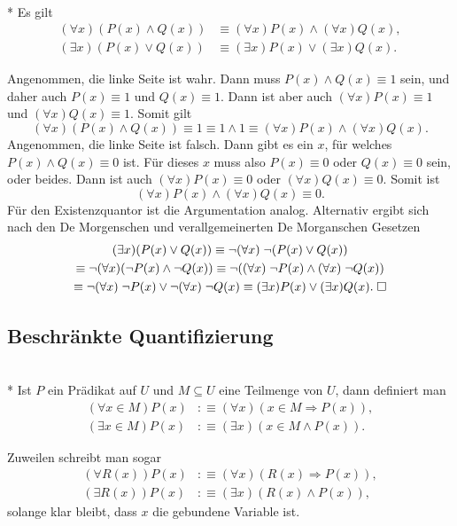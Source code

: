 \begin{Satz}[Verträglichkeitsgesetze]\mbox{}\\*
Es gilt
\begin{align*}
(\forall x)(P(x)\land Q(x)) &\equiv (\forall x)P(x)\land (\forall x)Q(x),\\
(\exists x)(P(x)\lor Q(x)) &\equiv (\exists x)P(x)\lor (\exists x)Q(x).
\end{align*}
\end{Satz}
 Angenommen, die linke Seite ist wahr. Dann muss
$P(x)\land Q(x)\equiv 1$ sein, und daher auch $P(x)\equiv 1$ und
$Q(x)\equiv 1$. Dann ist aber auch
$(\forall x)P(x)\equiv 1$ und $(\forall x)Q(x)\equiv 1$. Somit gilt
\begin{equation}
(\forall x)(P(x)\land Q(x)) \equiv 1 \equiv
1\land 1 \equiv (\forall x)P(x)\land (\forall x)Q(x).
\end{equation}
Angenommen, die linke Seite ist falsch. Dann gibt es
ein $x$, für welches $P(x)\land Q(x)\equiv 0$ ist. Für dieses $x$
muss also $P(x)\equiv 0$ oder $Q(x)\equiv 0$ sein, oder beides.
Dann ist auch $(\forall x)P(x)\equiv 0$ oder $(\forall x)Q(x)\equiv 0$.
Somit ist
\begin{equation}
(\forall x)P(x)\land(\forall x)Q(x)\equiv 0.
\end{equation}
Für den Existenzquantor ist die Argumentation analog. Alternativ
ergibt sich nach den De Morgenschen und verallgemeinerten De Morganschen
Gesetzen
\begin{gather}
(\exists x)(P(x)\lor Q(x))
\equiv \neg(\forall x)\;\neg (P(x)\lor Q(x))\\
\equiv \neg(\forall x)(\neg P(x)\land \neg Q(x))
\equiv \neg((\forall x)\;\neg P(x)\land (\forall x)\;\neg Q(x))\\
\equiv \neg(\forall x)\;\neg P(x)\lor\neg(\forall x)\;\neg Q(x)
\equiv (\exists x) P(x)\lor(\exists x) Q(x).\;\Box
\end{gather}


\newpage
\subsection{Beschränkte Quantifizierung}
\begin{Definition}\mbox{}\\*
Ist $P$ ein Prädikat auf $U$ und $M\subseteq U$ eine Teilmenge von
$U$, dann definiert man
\begin{align*}
(\forall x\in M)P(x) &:\equiv (\forall x)(x\in M\Rightarrow P(x)),\\
(\exists x\in M)P(x) &:\equiv (\exists x)(x\in M\land P(x)).
\end{align*}
\end{Definition}
Zuweilen schreibt man sogar
\begin{align}
(\forall R(x))P(x) &:\equiv (\forall x)(R(x)\Rightarrow P(x)),\\
(\exists R(x))P(x) &:\equiv (\exists x)(R(x)\land P(x)),
\end{align}
solange klar bleibt, dass $x$ die gebundene Variable ist.


